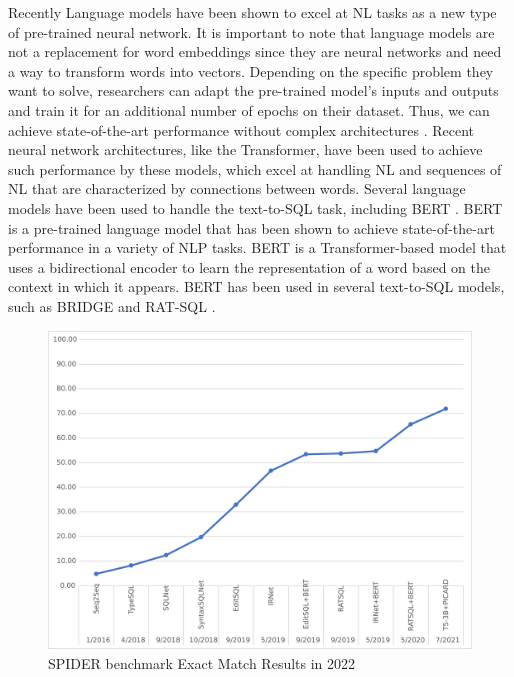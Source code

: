 Recently Language models have been shown to excel at NL tasks as a new type of pre-trained neural network. It is important to note that language models are not a replacement for word embeddings since they are neural networks and need a way to transform words into vectors.
Depending on the specific problem they want to solve, researchers can adapt the pre-trained model's inputs and outputs and train it for an additional number of epochs on their dataset. Thus, we can achieve state-of-the-art performance without complex architectures \cite{DBLP:journals/corr/abs-1810-04805}. Recent neural network architectures, like the Transformer\cite{https://doi.org/10.48550/arxiv.1706.03762}, have been used to achieve such performance by these models, which excel at handling NL and sequences of NL that are characterized by connections between words. Several language models have been used to handle the text-to-SQL task, including BERT \cite{DBLP:journals/corr/abs-1810-04805}. BERT is a pre-trained language model that has been shown to achieve state-of-the-art performance in a variety of NLP tasks. BERT is a Transformer-based model that uses a bidirectional encoder to learn the representation of a word based on the context in which it appears. BERT has been used in several text-to-SQL models, such as BRIDGE \cite{lin_bridging_2020} and RAT-SQL \cite{wang_rat_sql_2021}.


\begin{figure}[h]
  \centering
  \includegraphics[width=0.99\linewidth]{pics/benchmarkeps}
  \caption{SPIDER benchmark Exact Match Results in 2022}
  \label{fig:benchmark}
\end{figure}


\clearpage

\clearpage

\clearpage



% 
% 
% 
% 
% 
% 
% 
% 
